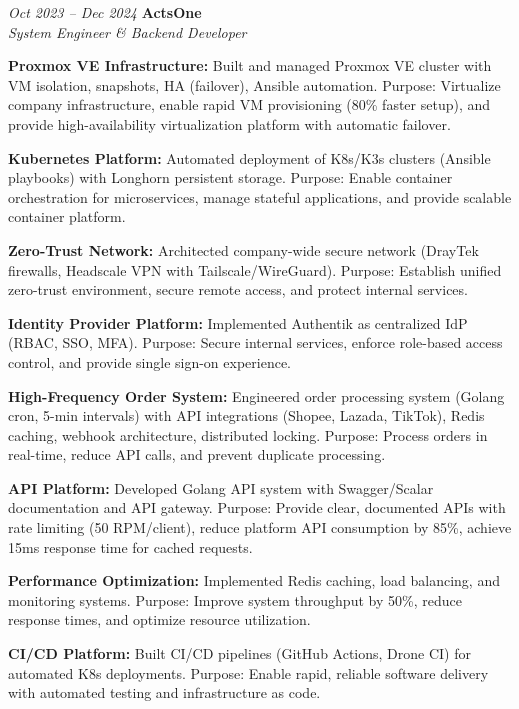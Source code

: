 \begin{twocolentry}{\textit{Oct 2023 -- Dec 2024}}
    \textbf{ActsOne} \\[4pt]
    \textit{System Engineer \& Backend Developer}
\end{twocolentry}
\begin{onecolentry}
    \begin{highlights}
        \item \textbf{Proxmox VE Infrastructure:} Built and managed Proxmox VE cluster with VM isolation, snapshots, HA (failover), Ansible automation. Purpose: Virtualize company infrastructure, enable rapid VM provisioning (80\% faster setup), and provide high-availability virtualization platform with automatic failover.
        \item \textbf{Kubernetes Platform:} Automated deployment of K8s/K3s clusters (Ansible playbooks) with Longhorn persistent storage. Purpose: Enable container orchestration for microservices, manage stateful applications, and provide scalable container platform.
        \item \textbf{Zero-Trust Network:} Architected company-wide secure network (DrayTek firewalls, Headscale VPN with Tailscale/WireGuard). Purpose: Establish unified zero-trust environment, secure remote access, and protect internal services.
        \item \textbf{Identity Provider Platform:} Implemented Authentik as centralized IdP (RBAC, SSO, MFA). Purpose: Secure internal services, enforce role-based access control, and provide single sign-on experience.
        \item \textbf{High-Frequency Order System:} Engineered order processing system (Golang cron, 5-min intervals) with API integrations (Shopee, Lazada, TikTok), Redis caching, webhook architecture, distributed locking. Purpose: Process orders in real-time, reduce API calls, and prevent duplicate processing.
        \item \textbf{API Platform:} Developed Golang API system with Swagger/Scalar documentation and API gateway. Purpose: Provide clear, documented APIs with rate limiting (50 RPM/client), reduce platform API consumption by 85\%, achieve 15ms response time for cached requests.
        \item \textbf{Performance Optimization:} Implemented Redis caching, load balancing, and monitoring systems. Purpose: Improve system throughput by 50\%, reduce response times, and optimize resource utilization.
        \item \textbf{CI/CD Platform:} Built CI/CD pipelines (GitHub Actions, Drone CI) for automated K8s deployments. Purpose: Enable rapid, reliable software delivery with automated testing and infrastructure as code.

\end{highlights}
\end{onecolentry}
